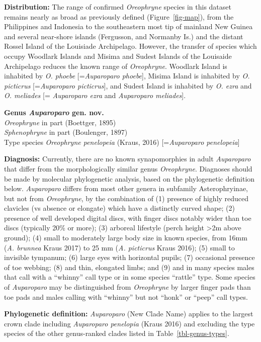 \documentclass[
  letterpaper,
  DIV=11,
  numbers=noendperiod]{scrartcl}
\begin{document}
\textbf{Distribution:} The range of confirmed \emph{Oreophryne} species
in this dataset remains nearly as broad as previously defined
(Figure~\ref{fig-map}), from the Philippines and Indonesia to the
southeastern most tip of mainland New Guinea and several near-shore
islands (Fergusson, and Normanby Is.) and the distant Rossel Island of
the Louisiade Archipelago. However, the transfer of species which occupy
Woodlark Islands and Misima and Sudest Islands of the Louisaide
Archipelago reduces the known range of \emph{Oreophryne}. Woodlark
Island is inhabited by \emph{O. phoebe} {[}=\emph{Auparoparo phoebe}{]},
Misima Island is inhabited by \emph{O. picticrus} {[}=\emph{Auparoparo
picticrus}{]}, and Sudest Island is inhabited by \emph{O. ezra} and
\emph{O. meliades} {[}= \emph{Auparoparo ezra} and \emph{Auparoparo
meliades}{]}.

\textbf{Genus \emph{Auparoparo} gen. nov.}\\
\emph{Oreophryne} in part (Boettger, 1895)\\
\emph{Sphenophryne} in part (Boulenger, 1897)\\
Type species \emph{Oreophryne penelopeia} (Kraus, 2016)
{[}=\emph{Auparoparo penelopeia}{]}

\textbf{Diagnosis:} Currently, there are no known synapomorphies in
adult \emph{Auparoparo} that differ from the morphologically similar
genus \emph{Oreophryne}. Diagnoses should be made by molecular
phylogenetic analysis, based on the phylogenetic definition below.
\emph{Auparoparo} differs from most other genera in subfamily
Asterophryinae, but not from \emph{Oreophryne}, by the combination of
(1) presence of highly reduced clavicles (vs absence or elongate) which
have a distinctly curved shape; (2) presence of well developed digital
discs, with finger discs notably wider than toe discs (typically 20\% or
more); (3) arboreal lifestyle (perch height \textgreater2m above
ground); (4) small to moderately large body size in known species, from
16mm (\emph{A. brunnea} Kraus 2017) to 25 mm (\emph{A. picticrus} Kraus
2016); (5) small to invisible tympanum; (6) large eyes with horizontal
pupils; (7) occasional presence of toe webbing; (8) and thin, elongated
limbs; and (9) and in many species males that call with a ``whinny''
call type or in some species ``rattle'' type. Some species of
\emph{Auparoparo} may be distinguished from \emph{Oreophryne} by larger
finger pads than toe pads and males calling with ``whinny'' but not
``honk'' or ``peep'' call types.

\textbf{Phylogenetic definition:} \emph{Auparoparo} (New Clade Name)
applies to the largest crown clade including \emph{Auparoparo penelopia}
(Kraus 2016) and excluding the type species of the other genus-ranked
clades listed in Table~\ref{tbl-genus-types}.
\end{document}
